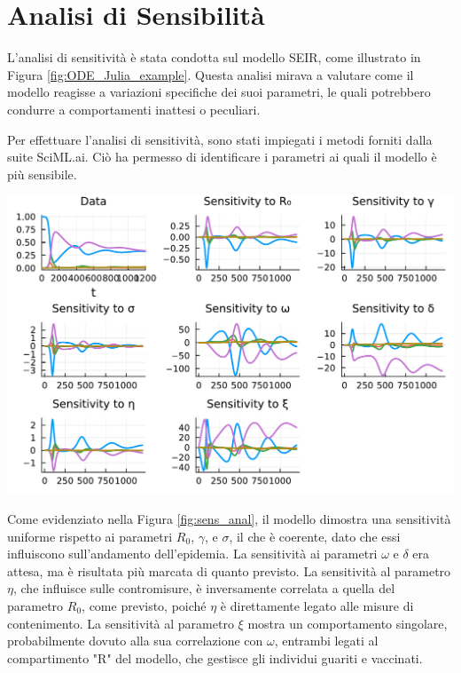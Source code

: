 \section{Analisi di Sensibilità}

L'analisi di sensitività è stata condotta sul modello SEIR, 
come illustrato in Figura \ref{fig:ODE_Julia_example}. 
Questa analisi mirava a valutare come il modello reagisse a 
variazioni specifiche dei suoi parametri, le quali potrebbero 
condurre a comportamenti inattesi o peculiari.

Per effettuare l'analisi di sensitività, sono stati impiegati i 
metodi forniti dalla suite SciML.ai. Ciò ha permesso di identificare 
i parametri ai quali il modello è più sensibile.

\begin{minipage}{\linewidth}
	\centering
	\includegraphics[width=\textwidth]{img/sa.pdf}
	\label{fig:sens_anal}
\end{minipage}

Come evidenziato nella Figura \ref{fig:sens_anal}, il modello 
dimostra una sensitività uniforme rispetto ai parametri 
$R_0$, $\gamma$, e $\sigma$, il che è coerente, dato che essi 
influiscono sull'andamento dell'epidemia. La sensitività ai parametri 
$\omega$ e $\delta$ era attesa, ma è risultata più marcata di 
quanto previsto. La sensitività al parametro $\eta$, che influisce 
sulle contromisure, è inversamente correlata a quella del 
parametro $R_0$, come previsto, poiché $\eta$ è direttamente 
legato alle misure di contenimento. La sensitività al parametro 
$\xi$ mostra un comportamento singolare, probabilmente dovuto 
alla sua correlazione con $\omega$, entrambi legati al compartimento 
"R" del modello, che gestisce gli individui guariti e vaccinati.

